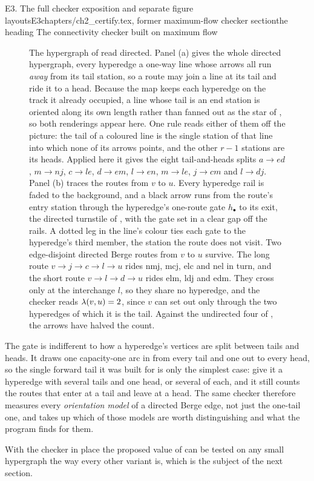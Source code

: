 \begin{offcut}{E3. The full checker exposition and separate figure layouts}{E3}{chapters/ch2\_certify.tex, former maximum-flow checker section}{the heading The connectivity checker built on maximum flow}
\begin{figure}[htbp]
{\begin{tikzpicture}
\end{tikzpicture}}
\caption[Directed Berge routes on a whole hypergraph]{The hypergraph
of  read directed. Panel (a) gives the whole directed
hypergraph, every hyperedge a one-way line whose arrows all run \emph{away} from
its tail station, so a route may join a line at its tail and ride it to a head.
Because the map keeps each hyperedge on the track it already occupied, a line
whose tail is an end station is oriented along its own length rather than fanned
out as the star of , so both renderings appear here.
One rule reads either of them off the picture: the tail of a coloured line is the
single station of that line into which none of its arrows points, and the other
$r-1$ stations are its heads. Applied here it gives the eight tail-and-heads
splits $a \to ed$, $m \to nj$, $c \to le$, $d \to em$, $l \to en$, $m \to le$,
$j \to cm$ and $l \to dj$. Panel
(b) traces the routes from $v$ to $u$. Every hyperedge rail is faded to the
background, and a black arrow runs from the route's entry station through the
hyperedge's one-route gate $h_{\bullet}$ to its exit, the directed turnstile of
, with the gate set in a clear gap off the rails. A dotted
leg in the line's colour ties each gate to the hyperedge's third member, the station
the route does not visit. Two edge-disjoint directed Berge routes from $v$ to $u$
survive. The long route
$v \to j \to c \to l \to u$ rides \textcolor{metroB}{nmj}, \textcolor{metroG}{mcj},
\textcolor{metroC}{elc} and \textcolor{metroF}{nel} in turn, and the short route
$v \to l \to d \to u$ rides \textcolor{metroH}{elm}, \textcolor{metroE}{ldj} and
\textcolor{metroD}{edm}. They cross only at the interchange $l$, so they share no
hyperedge, and the checker reads $\lambda(v, u) = 2$, since $v$ can set out only through
the two hyperedges of which it is the tail. Against the undirected four of
, the arrows have halved the count.}
\end{figure}

The gate is indifferent to how a hyperedge's vertices are split between tails and heads. It draws one capacity-one arc in from every tail and one out to every head, so the single forward tail it was built for is only the simplest case: give it a hyperedge with several tails and one head, or several of each, and it still counts the routes that enter at a tail and leave at a head. The same checker therefore measures every \emph{orientation model} of a directed Berge edge, not just the one-tail one, and  takes up which of those models are worth distinguishing and what the program finds for them.

With the checker in place the proposed value of  can be tested on any small hypergraph the way every other variant is, which is the subject of the next section.
\end{offcut}

